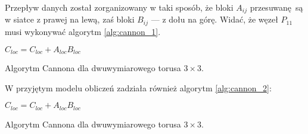 Przepływ danych został zorganizowany w taki sposób, że bloki \(A_{ij}\) przesuwanę są w siatce z prawej na lewą, zaś bloki \(B_{ij}\) --- z dołu na górę. Widać, że węzeł \(P_{11}\) musi wykonywać algorytm \ref{alg:cannon_1}.

\begin{algorithm}[H]
\centering
\begin{algorithmic}[1]
\State \(C_{loc} = C_{loc} + A_{loc}B_{loc}\)
\EndFor
\end{algorithmic}
\caption{Algorytm Cannona dla dwuwymiarowego torusa \(3\times 3\).}
\label{alg:cannon_1}
\end{algorithm}

\noindent W przyjętym modelu obliczeń zadziała również algorytm \ref{alg:cannon_2}:

\begin{algorithm}[H]
\centering
\begin{algorithmic}[1]
\State \(C_{loc} = C_{loc} + A_{loc}B_{loc}\)
\EndFor
\end{algorithmic}
\caption{Algorytm Cannona dla dwuwymiarowego torusa \(3\times 3\).}
\label{alg:cannon_2}
\end{algorithm}

